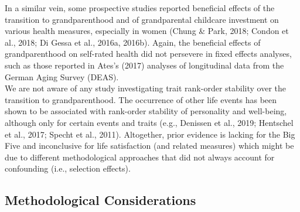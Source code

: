 \documentclass[
  english,
  man, noextraspace]{apa7}
\begin{document}
In a similar vein, some prospective studies reported beneficial effects of the transition to grandparenthood and of grandparental childcare investment on various health measures, especially in women (Chung \& Park, 2018; Condon et al., 2018; Di Gessa et al., 2016a, 2016b). Again, the beneficial effects of grandparenthood on self-rated health did not persevere in fixed effects analyses, such as those reported in Ates's (2017) analyses of longitudinal data from the German Aging Survey (DEAS).\\
We are not aware of any study investigating trait rank-order stability over the transition to grandparenthood. The occurrence of other life events has been shown to be associated with rank-order stability of personality and well-being, although only for certain events and traits (e.g., Denissen et al., 2019; Hentschel et al., 2017; Specht et al., 2011). Altogether, prior evidence is lacking for the Big Five and inconclusive for life satisfaction (and related measures) which might be due to different methodological approaches that did not always account for confounding (i.e., selection effects).

\hypertarget{methodological-considerations}{%
\subsection{Methodological Considerations}\label{methodological-considerations}}
\end{document}
